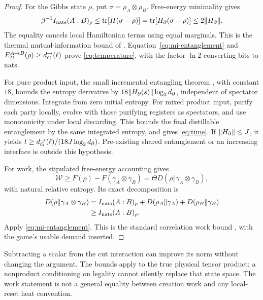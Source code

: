 \begin{proof}
For the Gibbs state $\rho$, put $\sigma=\rho_A\otimes\rho_B$.
Free-energy minimality gives
\[
 \beta^{-1}I_{\rm nats}(A:B)_\rho
 \leq\operatorname{tr}[H(\sigma-\rho)]
 =\operatorname{tr}[H_\partial(\sigma-\rho)]\leq2\lVert H_\partial\rVert.
\]
The equality cancels local Hamiltonian terms using equal marginals.
This is the thermal mutual-information bound of \cite{wolf}.
Equation~\eqref{eq:mi-entanglement} and
$E_D^{A\to B}(\rho)\geq d_G^{\to}(\ell)$ prove \eqref{eq:temperature}, with
the factor $\ln2$ converting bits to nats.

For pure product input, the small incremental entangling theorem
\cite{van}, with constant $18$, bounds the entropy derivative by
$18\lVert H_\partial(s)\rVert\log_2d_\partial$, independent of spectator
dimensions. Integrate from zero initial entropy. For mixed product
input, purify each party locally, evolve with those purifying registers
as spectators, and use monotonicity under local discarding. This bounds
the final distillable entanglement by the same integrated entropy,
and gives \eqref{eq:time}. If $\lVert H_\partial\rVert\leq J$, it yields
$t\geq d_G^{\to}(\ell)/(18J\log_2d_\partial)$. Pre-existing shared
entanglement or an increasing interface is outside this hypothesis.

For work, the stipulated free-energy accounting gives
\[
 \mathcal W\geq F(\rho)-F(\gamma_A\otimes\gamma_B)
       =\Theta D(\rho\Vert\gamma_A\otimes\gamma_B),
\]
with natural relative entropy. Its exact decomposition is
\begin{align*}
 D(\rho\Vert\gamma_A\otimes\gamma_B)
 &=I_{\rm nats}(A:B)_\rho
   +D(\rho_A\Vert\gamma_A)+D(\rho_B\Vert\gamma_B)\\
 &\geq I_{\rm nats}(A:B)_\rho.
\end{align*}
Apply \eqref{eq:mi-entanglement}. This is the standard correlation
work bound \cite{huber}, with the game's usable demand inserted.
\end{proof}

Subtracting a scalar from the cut interaction can improve its norm
without changing the argument. The bounds apply to the true physical
tensor product; a nonproduct conditioning on legality cannot silently
replace that state space. The work statement is not a general equality
between creation work and any local-reset heat convention.

